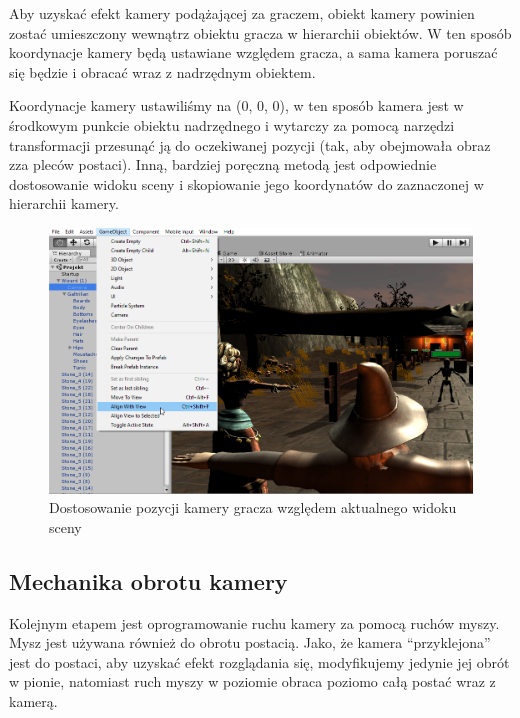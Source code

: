 \documentclass[openright]{xmgr}
\begin{document}
        Aby uzyskać efekt kamery podążającej za graczem, obiekt kamery powinien zostać umieszczony wewnątrz obiektu gracza w hierarchii obiektów. W ten sposób koordynacje kamery będą ustawiane względem gracza, a sama kamera poruszać się będzie i obracać wraz z nadrzędnym obiektem.

        Koordynacje kamery ustawiliśmy na (0, 0, 0), w ten sposób kamera jest w środkowym punkcie obiektu nadrzędnego i wytarczy za pomocą narzędzi transformacji przesunąć ją do oczekiwanej pozycji (tak, aby obejmowała obraz zza pleców postaci). Inną, bardziej poręczną metodą jest odpowiednie dostosowanie widoku sceny i skopiowanie jego koordynatów do zaznaczonej w hierarchii kamery.

        \begin{figure}[H]
        \center
        \includegraphics[width=\textwidth]{kamera_1.png}
        \caption{Dostosowanie pozycji kamery gracza względem aktualnego widoku sceny}
        \end{figure}
    
    \subsection{Mechanika obrotu kamery}

      Kolejnym etapem jest oprogramowanie ruchu kamery za pomocą ruchów myszy. Mysz jest używana również do obrotu postacią. Jako, że kamera \enquote{przyklejona} jest do postaci, aby uzyskać efekt rozglądania się, modyfikujemy jedynie jej obrót w pionie, natomiast ruch myszy w poziomie obraca poziomo całą postać wraz z kamerą.
\end{document}
